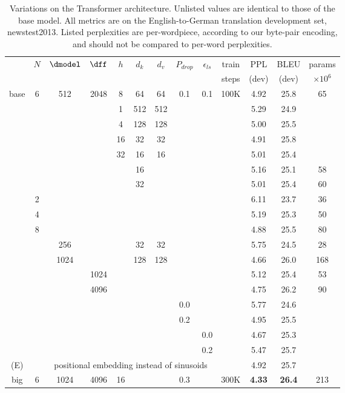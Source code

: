 \begin{table}[t]
\caption{Variations on the Transformer architecture. Unlisted values are identical to those of the base model.  All metrics are on the English-to-German translation development set, newstest2013.  Listed perplexities are per-wordpiece, according to our byte-pair encoding, and should not be compared to per-word perplexities.}
\label{tab:variations}
\begin{center}
\vspace{-2mm}
\begin{tabular}{c|ccccccccc|ccc}
\hline\rule{0pt}{2.0ex}
 & \multirow{2}{*}{$N$} & \multirow{2}{*}{$\dmodel$} &
\multirow{2}{*}{$\dff$} & \multirow{2}{*}{$h$} &
\multirow{2}{*}{$d_k$} & \multirow{2}{*}{$d_v$} &
\multirow{2}{*}{$P_{drop}$} & \multirow{2}{*}{$\epsilon_{ls}$} &
train & PPL & BLEU & params \\
 & & & & & & & & & steps & (dev) & (dev) & $\times10^6$ \\
\hline\rule{0pt}{2.0ex}
base & 6 & 512 & 2048 & 8 & 64 & 64 & 0.1 & 0.1 & 100K & 4.92 & 25.8 & 65 \\
\hline\rule{0pt}{2.0ex}
\multirow{4}{*}{(A)}
& & & & 1 & 512 & 512 & & & & 5.29 & 24.9 &  \\
& & & & 4 & 128 & 128 & & & & 5.00 & 25.5 &  \\
& & & & 16 & 32 & 32 & & & & 4.91 & 25.8 &  \\
& & & & 32 & 16 & 16 & & & & 5.01 & 25.4 &  \\
\hline\rule{0pt}{2.0ex}
\multirow{2}{*}{(B)}
& & & & & 16 & & & & & 5.16 & 25.1 & 58 \\
& & & & & 32 & & & & & 5.01 & 25.4 & 60 \\
\hline\rule{0pt}{2.0ex}
\multirow{7}{*}{(C)}
& 2 & & & & & & & &            & 6.11 & 23.7 & 36 \\
& 4 & & & & & & & &            & 5.19 & 25.3 & 50 \\
& 8 & & & & & & & &            & 4.88 & 25.5 & 80 \\
& & 256 & & & 32 & 32 & & &    & 5.75 & 24.5 & 28 \\
& & 1024 & & & 128 & 128 & & & & 4.66 & 26.0 & 168 \\
& & & 1024 & & & & & &         & 5.12 & 25.4 & 53 \\
& & & 4096 & & & & & &         & 4.75 & 26.2 & 90 \\
\hline\rule{0pt}{2.0ex}
\multirow{4}{*}{(D)}
& & & & & & & 0.0 & & & 5.77 & 24.6 &  \\
& & & & & & & 0.2 & & & 4.95 & 25.5 &  \\
& & & & & & & & 0.0 & & 4.67 & 25.3 &  \\
& & & & & & & & 0.2 & & 5.47 & 25.7 &  \\
\hline\rule{0pt}{2.0ex}
(E) & & \multicolumn{7}{c}{positional embedding instead of sinusoids} & & 4.92 & 25.7 & \\
\hline\rule{0pt}{2.0ex}
big & 6 & 1024 & 4096 & 16 & & & 0.3 & & 300K & \textbf{4.33} & \textbf{26.4} & 213 \\
\hline
\end{tabular}
\end{center}
\end{table}

